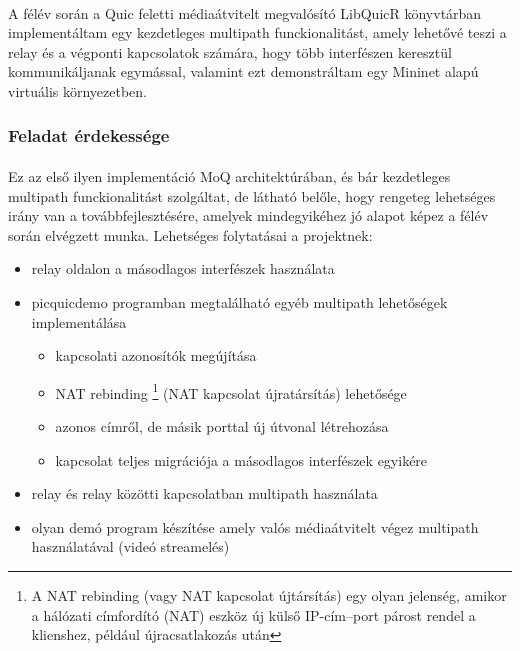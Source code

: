\documentclass[a4paper,oneside]{article}
\begin{document}
\paragraph{}
A félév során a Quic feletti médiaátvitelt megvalósító LibQuicR könyvtárban implementáltam 
egy kezdetleges multipath funckionalitást, amely lehetővé teszi a relay és a végponti 
kapcsolatok számára, hogy több interfészen keresztül kommunikáljanak egymással, valamint ezt demonstráltam egy Mininet alapú 
virtuális környezetben.


\subsubsection{Feladat érdekessége}
\paragraph{}

Ez az első ilyen implementáció MoQ architektúrában, és bár kezdetleges multipath funckionalitást szolgáltat,
de látható belőle, hogy rengeteg lehetséges irány van a továbbfejlesztésére, amelyek mindegyikéhez jó alapot 
képez a félév során elvégzett munka. Lehetséges folytatásai a projektnek:
\begin{itemize}
  \item relay oldalon a másodlagos interfészek használata
  \item picquicdemo programban megtalálható egyéb multipath lehetőségek implementálása
  \begin{itemize}
    \item kapcsolati azonosítók megújítása
    \item NAT rebinding \footnote{A NAT rebinding (vagy NAT kapcsolat újtársítás) egy olyan jelenség, 
    amikor a hálózati címfordító (NAT) eszköz új külső IP-cím–port párost rendel a klienshez, 
    például újracsatlakozás után} (NAT kapcsolat újratársítás) lehetősége
    \item azonos címről, de másik porttal új útvonal létrehozása
    \item kapcsolat teljes migrációja a másodlagos interfészek egyikére
  \end{itemize} 
  \item relay és relay közötti kapcsolatban multipath használata
  \item olyan demó program készítése amely valós médiaátvitelt végez multipath használatával (videó streamelés)
\end{itemize}
\end{document}
